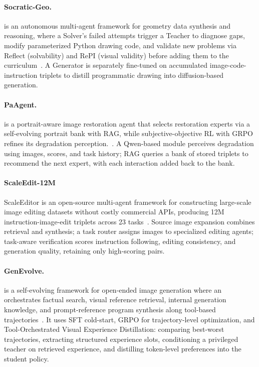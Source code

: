 \paragraph{Socratic-Geo.}
 is an autonomous multi-agent framework for geometry data synthesis and reasoning, where a Solver's failed attempts trigger a Teacher to diagnose gaps, modify parameterized Python drawing code, and validate new problems via Reflect (solvability) and RePI (visual validity) before adding them to the curriculum~\cite{avg260203414}. A Generator is separately fine-tuned on accumulated image-code-instruction triplets to distill programmatic drawing into diffusion-based generation. 

\paragraph{PaAgent.}
  is a portrait-aware image restoration agent that selects restoration experts via a self-evolving portrait bank with RAG, while subjective-objective RL with GRPO refines its degradation perception.~\cite{avg260317055}. A Qwen-based module perceives degradation using images, scores, and task history; RAG queries a bank of stored triplets to recommend the next expert, with each interaction added back to the bank.



\paragraph{ScaleEdit-12M}
 ScaleEditor is an open-source multi-agent framework for constructing large-scale image editing datasets without costly commercial APIs, producing 12M instruction-image-edit triplets across 23 tasks~\cite{avg260320644}. Source image expansion combines retrieval and synthesis; a task router assigns images to specialized editing agents; task-aware verification scores instruction following, editing consistency, and generation quality, retaining only high-scoring pairs. 



\paragraph{GenEvolve.}
 is a self-evolving framework for open-ended image generation where an orchestrates factual search, visual reference retrieval, internal generation knowledge, and prompt-reference program synthesis along tool-based trajectories~\cite{chen2026genevolve}. It uses SFT cold-start, GRPO for trajectory-level optimization, and Tool-Orchestrated Visual Experience Distillation: comparing best-worst trajectories, extracting structured experience slots, conditioning a privileged teacher on retrieved experience, and distilling token-level preferences into the student policy.


